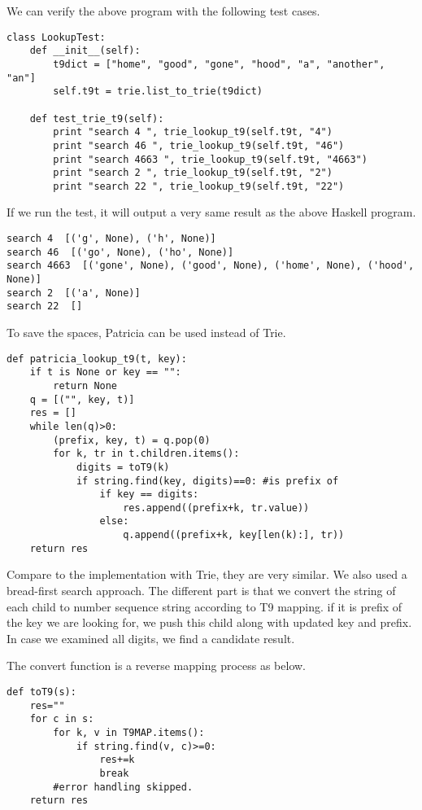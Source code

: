 \documentclass{article}
\begin{document}
We can verify the above program with the following test cases.

\begin{lstlisting}
class LookupTest:
    def __init__(self):
        t9dict = ["home", "good", "gone", "hood", "a", "another", "an"]
        self.t9t = trie.list_to_trie(t9dict)

    def test_trie_t9(self):
        print "search 4 ", trie_lookup_t9(self.t9t, "4")
        print "search 46 ", trie_lookup_t9(self.t9t, "46")
        print "search 4663 ", trie_lookup_t9(self.t9t, "4663")
        print "search 2 ", trie_lookup_t9(self.t9t, "2")
        print "search 22 ", trie_lookup_t9(self.t9t, "22")
\end{lstlisting}

If we run the test, it will output a very same result as the above Haskell
program.

\begin{verbatim}
search 4  [('g', None), ('h', None)]
search 46  [('go', None), ('ho', None)]
search 4663  [('gone', None), ('good', None), ('home', None), ('hood', None)]
search 2  [('a', None)]
search 22  []
\end{verbatim}

To save the spaces, Patricia can be used instead of Trie.

\begin{lstlisting}
def patricia_lookup_t9(t, key):
    if t is None or key == "":
        return None
    q = [("", key, t)]
    res = []
    while len(q)>0:
        (prefix, key, t) = q.pop(0)
        for k, tr in t.children.items():
            digits = toT9(k)
            if string.find(key, digits)==0: #is prefix of
                if key == digits:
                    res.append((prefix+k, tr.value))
                else:
                    q.append((prefix+k, key[len(k):], tr))
    return res
\end{lstlisting}

Compare to the implementation with Trie, they are very similar. We also
used a bread-first search approach. The different part is that we convert
the string of each child to number sequence string according to T9 mapping.
if it is prefix of the key we are looking for, we push this child along with
updated key and prefix. In case we examined all digits, we find a candidate
result.

The convert function is a reverse mapping process as below.
\begin{lstlisting}
def toT9(s):
    res=""
    for c in s:
        for k, v in T9MAP.items():
            if string.find(v, c)>=0:
                res+=k
                break
        #error handling skipped.
    return res
\end{lstlisting}
\end{document}
